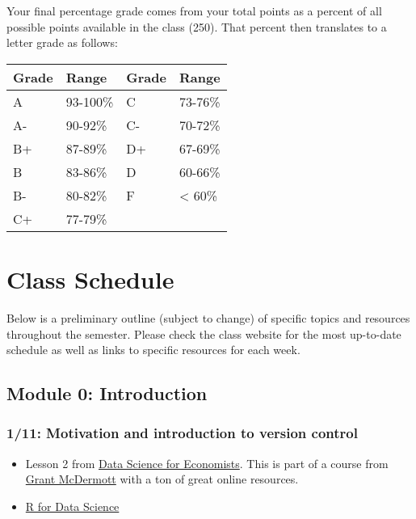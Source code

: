 \documentclass[11pt,]{article}
\providecommand{\tightlist}{%
  \setlength{\itemsep}{0pt}\setlength{\parskip}{0pt}}
\begin{document}
Your final percentage grade comes from your total points as a percent of
all possible points available in the class (250). That percent then
translates to a letter grade as follows:

\begin{longtable}[]{@{}llll@{}}
\toprule()
Grade & Range & Grade & Range \\
\midrule()
\endhead
A & 93-100\% & C & 73-76\% \\
A- & 90-92\% & C- & 70-72\% \\
B+ & 87-89\% & D+ & 67-69\% \\
B & 83-86\% & D & 60-66\% \\
B- & 80-82\% & F & \textless{} 60\% \\
C+ & 77-79\% & & \\
\bottomrule()
\end{longtable}

\hypertarget{class-schedule}{%
\section{Class Schedule}\label{class-schedule}}

Below is a preliminary outline (subject to change) of specific topics
and resources throughout the semester. Please check the class website
for the most up-to-date schedule as well as links to specific resources
for each week.

\hypertarget{module-0-introduction}{%
\subsection{Module 0: Introduction}\label{module-0-introduction}}

\hypertarget{motivation-and-introduction-to-version-control}{%
\subsubsection{1/11: Motivation and introduction to version
control}\label{motivation-and-introduction-to-version-control}}

\begin{itemize}
\tightlist
\item
  Lesson 2 from \href{https://github.com/uo-ec607/lectures}{Data Science
  for Economists}. This is part of a course from
  \href{https://grantmcdermott.com/}{Grant McDermott} with a ton of
  great online resources.
\item
  \href{https://r4ds.had.co.nz/}{R for Data Science}
\end{itemize}
\end{document}
